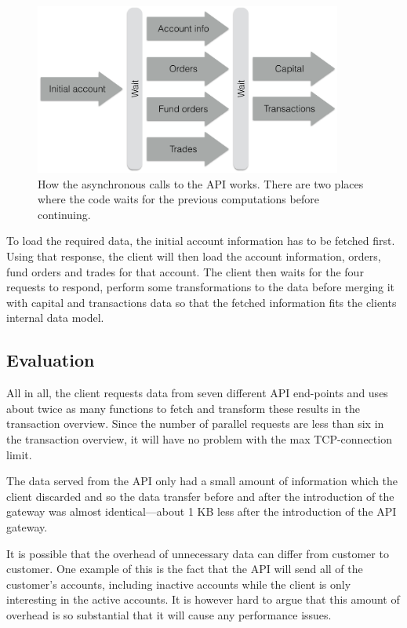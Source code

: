 \documentclass{cslthse-msc}
\begin{document}
\begin{figure}[H]
  \centering
    \begin{center}
      \includegraphics[width=0.9\textwidth]{images/bank_overview.png}
    \end{center}
  \caption{How the asynchronous calls to the API works. There are two places where the code waits for the previous computations before continuing.}
\end{figure}

To load the required data, the initial account information has to be fetched first. Using that response, the client will then load the account information, orders, fund orders and trades for that account. The client then waits for the four requests to respond, perform some transformations to the data before merging it with capital and transactions data so that the fetched information fits the clients internal data model.

\subsection{Evaluation}
All in all, the client requests data from seven different API end-points and uses about twice as many functions to fetch and transform these results in the transaction overview. Since the number of parallel requests are less than six in the transaction overview, it will have no problem with the max TCP-connection limit.

The data served from the API only had a small amount of information which the client discarded and so the data transfer before and after the introduction of the gateway was almost identical---about 1 KB less after the introduction of the API gateway.

It is possible that the overhead of unnecessary data can differ from customer to customer. One example of this is the fact that the API will send all of the customer's accounts, including inactive accounts while the client is only interesting in the active accounts. It is however hard to argue that this amount of overhead is so substantial that it will cause any performance issues.
\end{document}
